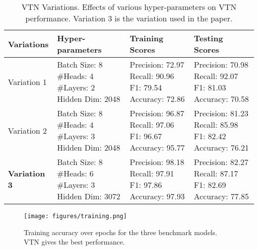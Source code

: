 \documentclass[letterpaper]{article}
\begin{document}
\begingroup
\renewcommand{\arraystretch}{1.25}
\begin{table*}[!h]
\centering

\begin{tabularx}{0.8\textwidth} { 
  >{\centering\arraybackslash}X 
  | >{\raggedright\arraybackslash}X 
  | >{\raggedright\arraybackslash}X
  | >{\raggedright\arraybackslash}X }
 
 \textbf{Variations} & \textbf{Hyper-parameters} & \textbf{Training Scores} & \textbf{Testing Scores} \\
 \hline
 \hline
 Variation 1 & {Batch Size: 8 \newline \#Heads: 4 \newline \#Layers: 2 \newline Hidden Dim: 2048} & {Precision: 72.97 \newline Recall: 90.96 \newline F1: 79.54 \newline Accuracy: 72.86} & {Precision: 70.98 \newline Recall: 92.07 \newline F1: 81.03 \newline Accuracy: 70.58}   \\
 \hline
  Variation 2 & {Batch Size: 8 \newline \#Heads: 4 \newline \#Layers: 3 \newline Hidden Dim: 2048} & {Precision: 96.87 \newline Recall: 97.06 \newline F1: 96.67 \newline Accuracy: 95.77} & {Precision: 81.23 \newline Recall: 85.98 \newline F1: 82.42 \newline Accuracy: 76.21}   \\
 \hline
  \textbf{Variation 3} & {Batch Size: 8 \newline \#Heads: 6 \newline \#Layers: 3 \newline Hidden Dim: 3072} & {Precision: 98.18 \newline Recall: 97.91 \newline F1: 97.86 \newline Accuracy: 97.93} & {Precision: 82.27 \newline Recall: 87.17 \newline F1: 82.69 \newline Accuracy: 77.85}
 
\end{tabularx}
\caption{VTN Variations. Effects of various hyper-parameters on VTN performance. Variation 3 is the variation used in the paper.}
\label{table:vtn_var}
\end{table*}
\endgroup

\begin{figure*}[htp]
    \centering
    \texttt{[image: figures/training.png]}
    \caption{Training accuracy over epochs for the three benchmark models. VTN gives the best performance.}
    \label{fig:training}
\end{figure*}
\end{document}
